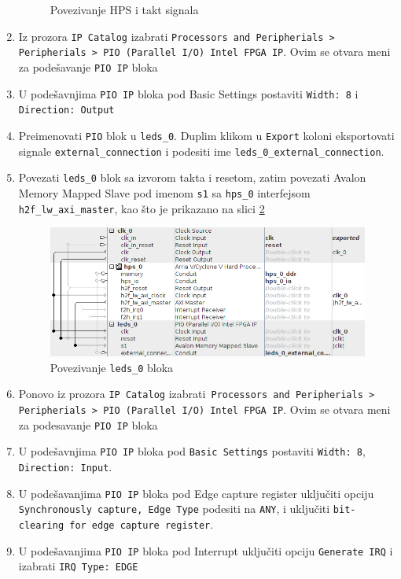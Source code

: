 \begin{enumerate}
\begin{figure}[h!]
\caption{Povezivanje HPS i takt signala}
\label{slika:q1}
\end{figure}
\item  Iz prozora \texttt{IP Catalog} izabrati \texttt{Processors and Peripherials > Peripherials > PIO (Parallel I/O) Intel FPGA IP}. Ovim se otvara meni za podešavanje \texttt{PIO IP} bloka
\item  U podešavnjima \texttt{PIO IP} bloka pod Basic Settings postaviti \texttt{Width: 8} i \texttt{Direction: Output}
\item  Preimenovati \texttt{PIO} blok u \texttt{leds\_0}. Duplim klikom u \texttt{Export} koloni eksportovati signale \texttt{external\_connection} i podesiti ime \texttt{leds\_0\_external\_connection}.
\item  Povezati \texttt{leds\_0} blok sa izvorom takta i resetom, zatim povezati Avalon Memory Mapped Slave pod imenom \texttt{s1} sa \texttt{hps\_0} interfejsom \texttt{h2f\_lw\_axi\_master}, kao što je prikazano na slici \ref{slika:q2}
\begin{figure}[h!]
\centering
\includegraphics[scale=0.9]{img/quartus2.png}
\caption{Povezivanje \texttt{leds\_0} bloka}
\label{slika:q2}
\end{figure}
\item  Ponovo iz prozora \texttt{IP Catalog} izabrati\texttt{ Processors and Peripherials > Peripherials > PIO (Parallel I/O) Intel FPGA IP}. Ovim se otvara meni za podesavanje \texttt{PIO IP} bloka
\item  U podešavnjima \texttt{PIO IP} bloka pod \texttt{Basic Settings} postaviti \texttt{Width: 8}, \texttt{Direction: Input}.
\item  U podešavanjima \texttt{PIO IP} bloka pod Edge capture register uključiti opciju \texttt{Synchronously capture, Edge Type} podesiti na \texttt{ANY}, i uključiti \texttt{bit-clearing for edge capture register}.
\item  U podešavanjima \texttt{PIO IP} bloka pod Interrupt uključiti opciju \texttt{Generate IRQ} i izabrati \texttt{IRQ Type: EDGE}

\end{enumerate}
